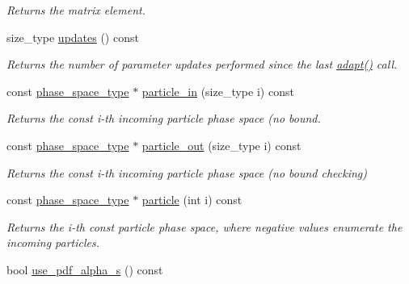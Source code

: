 \begin{DoxyCompactItemize}
\begin{DoxyCompactList}\small\item\em Returns the matrix element. \end{DoxyCompactList}\item 
size\+\_\+type \hyperlink{a00436_ae23a9709f1f19e1bb8f7109769296b83}{updates} () const 
\begin{DoxyCompactList}\small\item\em Returns the number of parameter updates performed since the last \hyperlink{a00436_a7f97f414b5f3d689efb551aa4f6b1d1c}{adapt()} call. \end{DoxyCompactList}\item 
\hypertarget{a00436_a3203c3acdc1ff32dd2e524e9fa536cf6}{}const \hyperlink{a00406}{phase\+\_\+space\+\_\+type} $\ast$ \hyperlink{a00436_a3203c3acdc1ff32dd2e524e9fa536cf6}{particle\+\_\+in} (size\+\_\+type i) const \label{a00436_a3203c3acdc1ff32dd2e524e9fa536cf6}

\begin{DoxyCompactList}\small\item\em Returns the const i-\/th incoming particle phase space (no bound. \end{DoxyCompactList}\item 
\hypertarget{a00436_a20c6bf03b10a4ea91a9283041168753e}{}const \hyperlink{a00406}{phase\+\_\+space\+\_\+type} $\ast$ \hyperlink{a00436_a20c6bf03b10a4ea91a9283041168753e}{particle\+\_\+out} (size\+\_\+type i) const \label{a00436_a20c6bf03b10a4ea91a9283041168753e}

\begin{DoxyCompactList}\small\item\em Returns the const i-\/th incoming particle phase space (no bound checking) \end{DoxyCompactList}\item 
const \hyperlink{a00406}{phase\+\_\+space\+\_\+type} $\ast$ \hyperlink{a00436_a505447e7e96d765e69d9e622439bbc52}{particle} (int i) const 
\begin{DoxyCompactList}\small\item\em Returns the i-\/th const particle phase space, where negative values enumerate the incoming particles. \end{DoxyCompactList}\item 
\hypertarget{a00436_a91b7ae85d57c380f1508a16a5cde31b6}{}bool \hyperlink{a00436_a91b7ae85d57c380f1508a16a5cde31b6}{use\+\_\+pdf\+\_\+alpha\+\_\+s} () const \label{a00436_a91b7ae85d57c380f1508a16a5cde31b6}


\end{DoxyCompactItemize}
